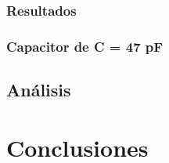 \documentclass{article}
\begin{document}
        \subsubsection*{Resultados}
        \subsubsection*{Capacitor de C = 47 pF}


    \subsection{Análisis}
\section{Conclusiones}
\end{document}
